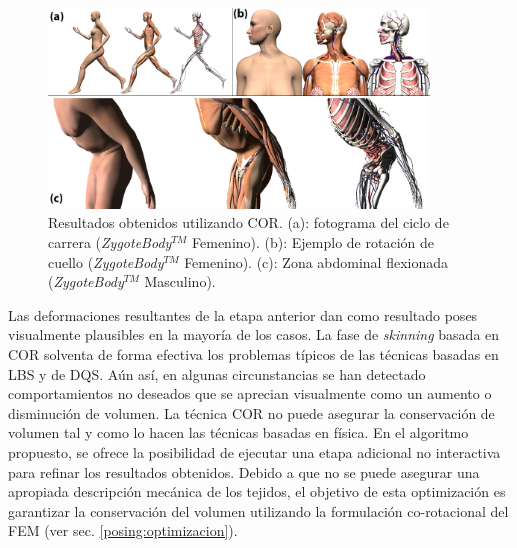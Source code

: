 \begin{figure}%
   \centering
   \includegraphics[width=0.90\textwidth]{IMG/examples}
    \caption{Resultados obtenidos utilizando \acs{COR}. (a): fotograma del ciclo de carrera (\emph{ZygoteBody}$^{TM}$ Femenino). (b): Ejemplo de rotación de cuello (\emph{ZygoteBody}$^{TM}$ Femenino). (c): Zona abdominal flexionada (\emph{ZygoteBody}$^{TM}$ Masculino).}
    \label{fig:run1}
\end{figure}
\clearpage


Las deformaciones resultantes de la etapa anterior dan como resultado poses visualmente plausibles en la mayoría de los casos. 
La fase de \emph{skinning} basada en \ac{COR} solventa de forma efectiva los problemas típicos de las técnicas basadas en \ac{LBS} y de \ac{DQS}. Aún así, en algunas circunstancias se han detectado comportamientos no deseados que se aprecian visualmente como un aumento o disminución de volumen. 
La técnica \ac{COR} no puede asegurar la conservación de volumen tal y como lo hacen las técnicas basadas en física. %
En el algoritmo propuesto, se ofrece la posibilidad de ejecutar una etapa adicional no interactiva para refinar los resultados obtenidos.
Debido a que no se puede asegurar una apropiada descripción mecánica de los tejidos, el objetivo de esta optimización es garantizar la conservación del volumen utilizando la formulación co-rotacional del \acs{FEM} (ver sec. \ref{posing:optimizacion}).

